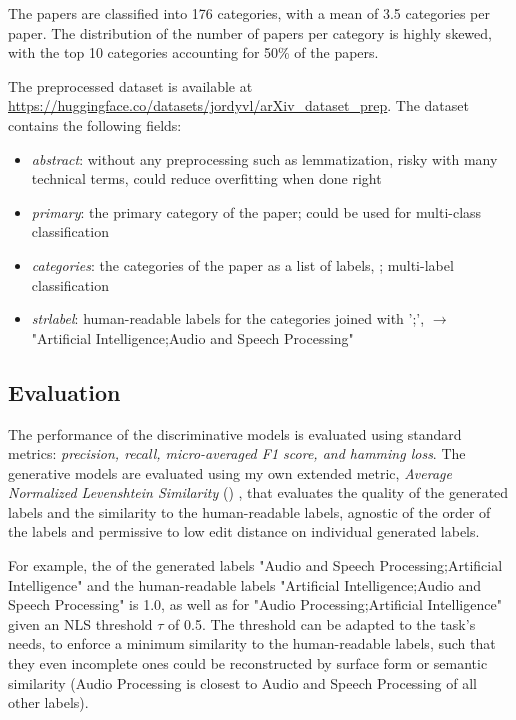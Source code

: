 \documentclass[10pt,letterpaper]{article}
\begin{document}
The papers are classified into 176 categories, with a mean of 3.5 categories per paper. The distribution of the number of papers per category is highly skewed, with the top 10 categories accounting for 50\% of the papers.

The preprocessed dataset is available at \url{https://huggingface.co/datasets/jordyvl/arXiv_dataset_prep}. The dataset contains the following fields:
\begin{itemize}[noitemsep]
  \item \textit{abstract}: without any preprocessing such as lemmatization, risky with many technical terms, could reduce overfitting when done right
  \item \textit{primary}: the primary category of the paper; could be used for multi-class classification
  \item \textit{categories}: the categories of the paper as a list of labels, \eg [cs.AI, eess.AS]; multi-label classification
  \item \textit{strlabel}: human-readable labels for the categories joined with ';', \eg [cs.AI, eess.AS]  $\to$ "Artificial Intelligence;Audio and Speech Processing"
\end{itemize}


\subsection{Evaluation}

The performance of the discriminative models is evaluated using standard metrics: \textit{precision, recall, micro-averaged F1 score, and hamming loss}.
The generative models are evaluated using my own extended metric, \textit{Average Normalized Levenshtein Similarity} (\ANLS) \cite{VanLandeghem2023dude}, that evaluates the quality of the generated labels and the similarity to the human-readable labels, agnostic of the order of the labels and permissive to low edit distance on individual generated labels.

For example, the \ANLS of the generated labels "Audio and Speech Processing;Artificial Intelligence" and the human-readable labels "Artificial Intelligence;Audio and Speech Processing" is 1.0, as well as for "Audio Processing;Artificial Intelligence" given an NLS threshold $\tau$ of 0.5. The threshold can be adapted to the task's needs, \eg to enforce a minimum similarity to the human-readable labels, such that they even incomplete ones could be reconstructed by surface form or semantic similarity (\eg Audio Processing is closest to Audio and Speech Processing of all other labels).
\end{document}
